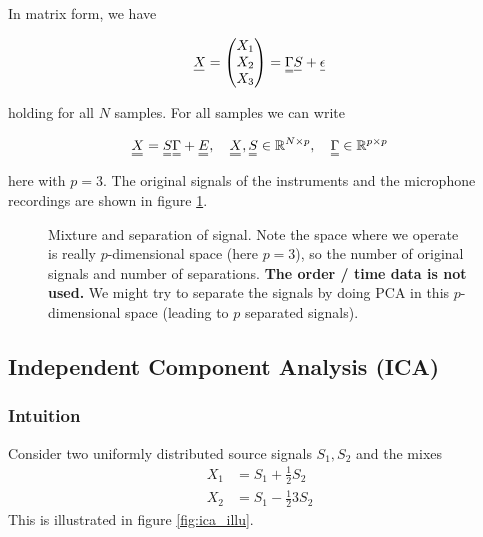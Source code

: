 
In matrix form, we have

\begin{equation}
    \vec{X} = \begin{pmatrix} X_1 \\ X_2 \\ X_3 \end{pmatrix} = \mat{\Gamma} \vec{S} + \vec{\epsilon}
\end{equation}

holding for all $N$ samples. For all samples we can write

\begin{equation}
    \mat{X} = \mat{S} \mat{\Gamma} + \mat{E}, \quad \mat{X}, \mat{S} \in \mathbb{R}^{N \times p}, \quad \mat{\Gamma} \in \mathbb{R}^{p \times p}
\end{equation}

here with $p = 3$. The original signals of the instruments and the microphone recordings
are shown in figure \ref{fig:cocktail_party}.

\begin{figure}[H]
    \centering
    
    \caption{Mixture and separation of signal. Note the space where we operate is really $p$-dimensional space (here $p=3$),
    so the number of original signals and number of separations. \textbf{The order / time data is not used.} We might try to
    separate the signals by doing PCA in this $p$-dimensional space (leading to $p$ separated signals).}
    \label{fig:cocktail_party}
\end{figure}


\subsection{Independent Component Analysis (ICA)}

\subsubsection{Intuition}
Consider two uniformly distributed source signals $S_1, S_2$ and the mixes
\begin{equation}
    \begin{aligned}
        X_1 &= S_1 + \frac{1}{2} S_2 \\
        X_2 &= S_1 - \frac{1}{2} 3S_2
    \end{aligned}
\end{equation}
This is illustrated in figure \ref{fig:ica_illu}.

